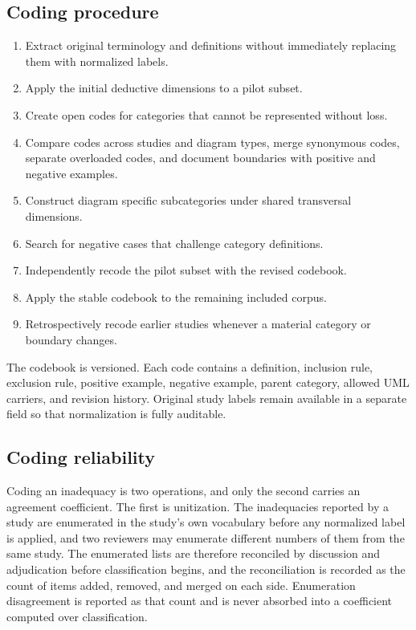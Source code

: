 \subsection{Coding procedure}

\begin{enumerate}[label=\arabic*)]
    \item Extract original terminology and definitions without immediately replacing them with normalized labels.
    \item Apply the initial deductive dimensions to a pilot subset.
    \item Create open codes for categories that cannot be represented without loss.
    \item Compare codes across studies and diagram types, merge synonymous codes, separate overloaded codes, and document boundaries with positive and negative examples.
    \item Construct diagram specific subcategories under shared transversal dimensions.
    \item Search for negative cases that challenge category definitions.
    \item Independently recode the pilot subset with the revised codebook.
    \item Apply the stable codebook to the remaining included corpus.
    \item Retrospectively recode earlier studies whenever a material category or boundary changes.
\end{enumerate}

The codebook is versioned. Each code contains a definition, inclusion rule, exclusion rule, positive example, negative example, parent category, allowed UML carriers, and revision history. Original study labels remain available in a separate field so that normalization is fully auditable.

\subsection{Coding reliability}

Coding an inadequacy is two operations, and only the second carries an agreement coefficient. The first is unitization. The inadequacies reported by a study are enumerated in the study's own vocabulary before any normalized label is applied, and two reviewers may enumerate different numbers of them from the same study. The enumerated lists are therefore reconciled by discussion and adjudication before classification begins, and the reconciliation is recorded as the count of items added, removed, and merged on each side. Enumeration disagreement is reported as that count and is never absorbed into a coefficient computed over classification.


